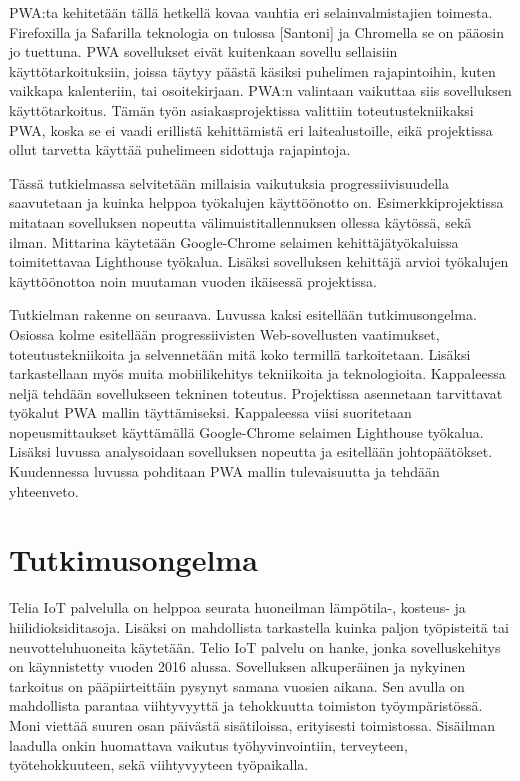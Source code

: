 \documentclass{tktltiki}
\begin{document}
PWA:ta kehitetään tällä hetkellä kovaa vauhtia eri selainvalmistajien toimesta. Firefoxilla ja Safarilla teknologia on tulossa [Santoni] ja Chromella se on pääosin jo tuettuna. PWA sovellukset eivät kuitenkaan sovellu sellaisiin käyttötarkoituksiin, joissa täytyy päästä käsiksi puhelimen rajapintoihin, kuten vaikkapa kalenteriin, tai osoitekirjaan. PWA:n valintaan vaikuttaa siis sovelluksen käyttötarkoitus. Tämän työn asiakasprojektissa valittiin toteutustekniikaksi PWA, koska se ei vaadi erillistä kehittämistä eri laitealustoille, eikä projektissa ollut tarvetta käyttää puhelimeen sidottuja rajapintoja.

Tässä tutkielmassa selvitetään millaisia vaikutuksia progressiivisuudella saavutetaan ja kuinka helppoa työkalujen käyttöönotto on. Esimerkkiprojektissa mitataan sovelluksen nopeutta välimuistitallennuksen ollessa käytössä, sekä ilman. Mittarina käytetään Google-Chrome selaimen kehittäjätyökaluissa toimitettavaa Lighthouse työkalua. Lisäksi sovelluksen kehittäjä arvioi työkalujen käyttöönottoa noin muutaman vuoden ikäisessä projektissa. 

Tutkielman rakenne on seuraava. Luvussa kaksi esitellään tutkimusongelma. Osiossa kolme esitellään progressiivisten Web-sovellusten vaatimukset, toteutustekniikoita ja selvennetään mitä koko termillä tarkoitetaan. Lisäksi tarkastellaan myös muita mobiilikehitys tekniikoita ja teknologioita. Kappaleessa neljä tehdään sovellukseen tekninen toteutus. Projektissa asennetaan tarvittavat työkalut PWA mallin täyttämiseksi. Kappaleessa viisi suoritetaan nopeusmittaukset käyttämällä Google-Chrome selaimen Lighthouse työkalua. Lisäksi luvussa analysoidaan sovelluksen nopeutta ja esitellään johtopäätökset. Kuudennessa luvussa pohditaan PWA mallin tulevaisuutta ja tehdään yhteenveto. 

\newpage
\section{Tutkimusongelma}

Telia IoT palvelulla on helppoa seurata huoneilman lämpötila-, kosteus- ja hiilidioksiditasoja. Lisäksi on mahdollista tarkastella kuinka paljon työpisteitä tai neuvotteluhuoneita käytetään. Telio IoT palvelu on hanke, jonka sovelluskehitys on käynnistetty vuoden 2016 alussa. Sovelluksen alkuperäinen ja nykyinen tarkoitus on pääpiirteittäin pysynyt samana vuosien aikana. Sen avulla on mahdollista parantaa viihtyvyyttä ja tehokkuutta toimiston työympäristössä. Moni viettää suuren osan päivästä sisätiloissa, erityisesti toimistossa. Sisäilman laadulla onkin huomattava vaikutus työhyvinvointiin, terveyteen, työtehokkuuteen, sekä viihtyvyyteen työpaikalla. 
\end{document}
